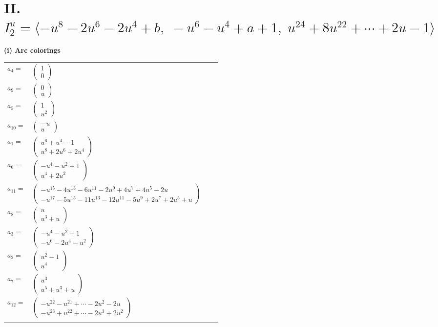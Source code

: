 \documentclass[1p]{elsarticle_modified}
\theoremstyle{definition}
\begin{document}
\centering \section*{II. $I^u_{2}= \langle - u^8-2 u^6-2 u^4+b,\;- u^6- u^4+a+1,\;u^{24}+8 u^{22}+\cdots+2 u-1 \rangle$}
\flushleft \textbf{(i) Arc colorings}\\
\begin{tabular}{m{7pt} m{180pt} m{7pt} m{180pt} }
\flushright $a_{4}=$&$\begin{pmatrix}1\\0\end{pmatrix}$ \\
\flushright $a_{9}=$&$\begin{pmatrix}0\\u\end{pmatrix}$ \\
\flushright $a_{5}=$&$\begin{pmatrix}1\\u^2\end{pmatrix}$ \\
\flushright $a_{10}=$&$\begin{pmatrix}- u\\u\end{pmatrix}$ \\
\flushright $a_{1}=$&$\begin{pmatrix}u^6+u^4-1\\u^8+2 u^6+2 u^4\end{pmatrix}$ \\
\flushright $a_{6}=$&$\begin{pmatrix}- u^4- u^2+1\\u^4+2 u^2\end{pmatrix}$ \\
\flushright $a_{11}=$&$\begin{pmatrix}- u^{15}-4 u^{13}-6 u^{11}-2 u^9+4 u^7+4 u^5-2 u\\- u^{17}-5 u^{15}-11 u^{13}-12 u^{11}-5 u^9+2 u^7+2 u^5+u\end{pmatrix}$ \\
\flushright $a_{8}=$&$\begin{pmatrix}u\\u^3+u\end{pmatrix}$ \\
\flushright $a_{3}=$&$\begin{pmatrix}- u^4- u^2+1\\- u^6-2 u^4- u^2\end{pmatrix}$ \\
\flushright $a_{2}=$&$\begin{pmatrix}u^2-1\\u^4\end{pmatrix}$ \\
\flushright $a_{7}=$&$\begin{pmatrix}u^3\\u^5+u^3+u\end{pmatrix}$ \\
\flushright $a_{12}=$&$\begin{pmatrix}- u^{22}- u^{21}+\cdots-2 u^2-2 u\\- u^{23}+u^{22}+\cdots-2 u^3+2 u^2\end{pmatrix}$\\&\end{tabular}
\end{document}
